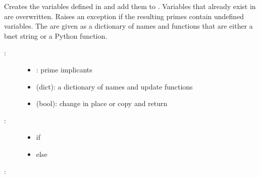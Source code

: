 \documentclass[letterpaper,10pt,english]{sphinxmanual}
\begin{document}
\begin{fulllineitems}
\label{\detokenize{PrimeImplicants:PyBoolNet.PrimeImplicants.create_variables}}
Creates the variables defined in  and add them to .
Variables that already exist in  are overwritten.
Raises an exception if the resulting primes contain undefined variables.
The  are given as a dictionary of names and functions that are either a bnet string or a Python function.
\begin{description}
\item[{:}] \leavevmode\begin{itemize}
\item {} 
: prime implicants

\item {} 
 (dict): a dictionary of names and update functions

\item {} 
 (bool): change  in place or copy and return

\end{itemize}

\item[{:}] \leavevmode\begin{itemize}
\item {} 
 if 

\item {} 
 else

\end{itemize}

\end{description}

:


\end{fulllineitems}
\end{document}
